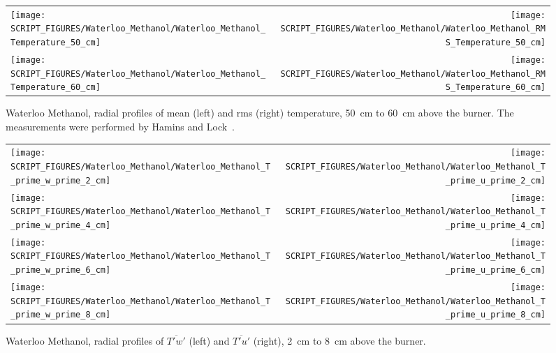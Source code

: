 \begin{figure}[p]
\begin{tabular*}{\textwidth}{l@{\extracolsep{\fill}}r}
\texttt{[image: SCRIPT\_FIGURES/Waterloo\_Methanol/Waterloo\_Methanol\_Temperature\_50\_cm]} &
\texttt{[image: SCRIPT\_FIGURES/Waterloo\_Methanol/Waterloo\_Methanol\_RMS\_Temperature\_50\_cm]} \\
\texttt{[image: SCRIPT\_FIGURES/Waterloo\_Methanol/Waterloo\_Methanol\_Temperature\_60\_cm]} &
\texttt{[image: SCRIPT\_FIGURES/Waterloo\_Methanol/Waterloo\_Methanol\_RMS\_Temperature\_60\_cm]}
\end{tabular*}
\caption[Waterloo Methanol, radial mean and rms temperature, 50~cm to 60~cm above burner]
{Waterloo Methanol, radial profiles of mean (left) and rms (right) temperature, 50~cm to 60~cm above the burner. The measurements were performed by Hamins and Lock~\cite{Hamins:TN1928}.}
\label{Water_Methanol_Plume_Temp_4}
\end{figure}


\begin{figure}[p]
\begin{tabular*}{\textwidth}{l@{\extracolsep{\fill}}r}
\texttt{[image: SCRIPT\_FIGURES/Waterloo\_Methanol/Waterloo\_Methanol\_T\_prime\_w\_prime\_2\_cm]} &
\texttt{[image: SCRIPT\_FIGURES/Waterloo\_Methanol/Waterloo\_Methanol\_T\_prime\_u\_prime\_2\_cm]} \\
\texttt{[image: SCRIPT\_FIGURES/Waterloo\_Methanol/Waterloo\_Methanol\_T\_prime\_w\_prime\_4\_cm]} &
\texttt{[image: SCRIPT\_FIGURES/Waterloo\_Methanol/Waterloo\_Methanol\_T\_prime\_u\_prime\_4\_cm]} \\
\texttt{[image: SCRIPT\_FIGURES/Waterloo\_Methanol/Waterloo\_Methanol\_T\_prime\_w\_prime\_6\_cm]} &
\texttt{[image: SCRIPT\_FIGURES/Waterloo\_Methanol/Waterloo\_Methanol\_T\_prime\_u\_prime\_6\_cm]} \\
\texttt{[image: SCRIPT\_FIGURES/Waterloo\_Methanol/Waterloo\_Methanol\_T\_prime\_w\_prime\_8\_cm]} &
\texttt{[image: SCRIPT\_FIGURES/Waterloo\_Methanol/Waterloo\_Methanol\_T\_prime\_u\_prime\_8\_cm]}
\end{tabular*}
\caption[Waterloo Methanol, radial profiles of $\overline{T'w'}$ and $\overline{T'u'}$, 2~cm to 8~cm above the burner]
{Waterloo Methanol, radial profiles of $\overline{T'w'}$ (left) and $\overline{T'u'}$ (right), 2~cm to 8~cm above the burner.}
\label{Water_Methanol_Tpwp_1}
\end{figure}

